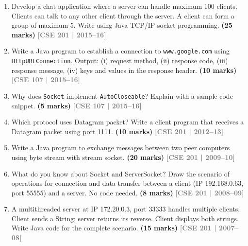 \documentclass[12pt,a3paper]{article}
\newcommand{\yr}[1]{\hfill\textcolor{gray}{\small\textbf{[#1]}}}
\newcommand{\mk}[1]{\textcolor{orange!70!black}{\small\textbf{(#1 marks)}}}
\begin{document}
\begin{enumerate}
\item Develop a chat application where a server can handle maximum 100 clients. Clients can talk to any other client through the server. A client can form a group of maximum 5. Write using Java TCP/IP socket programming. \mk{25}
\yr{CSE 201 | 2015--16}




\item Write a Java program to establish a connection to \texttt{www.google.com} using \\\texttt{HttpURLConnection}. Output: (i) request method, (ii) response code, (iii) response message, (iv) keys and values in the response header. \mk{10}
\yr{CSE 107 | 2015--16}




\item Why does \texttt{Socket} implement \texttt{AutoCloseable}? Explain with a sample code snippet. \mk{5}
\yr{CSE 107 | 2015--16}






\item Which protocol uses Datagram packet? Write a client program that receives a Datagram packet using port 1111. \mk{10}
\yr{CSE 201 | 2012--13}




\item Write a Java program to exchange messages between two peer computers using byte stream with stream socket. \mk{20}
\yr{CSE 201 | 2009--10}




\item What do you know about Socket and ServerSocket? Draw the scenario of operations for connection and data transfer between a client (IP 192.168.0.63, port 55555) and a server. No code needed. \mk{8}
\yr{CSE 201 | 2008--09}




\item A multithreaded server at IP 172.20.0.3, port 33333 handles multiple clients. Client sends a String; server returns its reverse. Client displays both strings. Write Java code for the complete scenario. \mk{15}
\yr{CSE 201 | 2007--08}





\end{enumerate}
\end{document}
